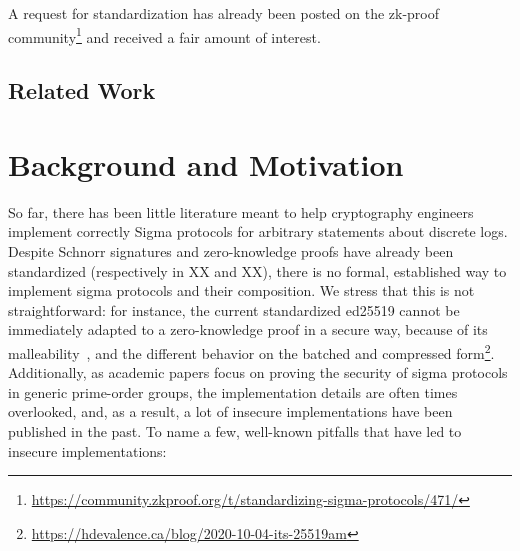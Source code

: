 \documentclass[runningheads]{llncs}
\begin{document}
A request for standardization has already been posted on the zk-proof community\footnote{\url{https://community.zkproof.org/t/standardizing-sigma-protocols/471/}} and received a fair amount of interest.

\subsection{Related Work}

\section{Background and Motivation}
\label{sec:motivation}
So far, there has been little literature meant to help cryptography engineers implement correctly Sigma protocols for arbitrary statements about discrete logs.
Despite Schnorr signatures and zero-knowledge proofs have already been standardized (respectively in XX and XX), there is no formal, established way to implement sigma protocols and their composition. We stress that this is not straightforward:
 for instance, the current standardized ed25519 cannot be immediately adapted to a zero-knowledge proof in a secure way, because of its malleability~\cite[p. 7]{JCEng:BDLSY12},  and the different behavior on the batched and compressed form\footnote{\url{https://hdevalence.ca/blog/2020-10-04-its-25519am}}.
 Additionally, as academic papers focus on proving the security of sigma protocols in generic prime-order groups, the implementation details are often times overlooked, and, as a result, a lot of insecure implementations have been published in the past. To name a few, well-known pitfalls that have led to insecure implementations:
\end{document}
